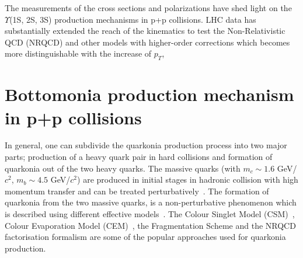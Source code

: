 The measurements of the cross sections and polarizations have shed light on the
$\Upsilon$(1S, 2S, 3S) production mechanisms in p+p collisions.
LHC data has substantially extended the reach of the kinematics to test the
Non-Relativistic QCD (NRQCD) and other models with
higher-order corrections which becomes more
distinguishable with the increase of $p_{T}$,






\section{Bottomonia production mechanism in p+p collisions}
\label{sec:Bottomonia_pp_th}


In general, one can subdivide the quarkonia production process into two major parts;
production of a heavy quark pair in hard collisions and formation of quarkonia
out of the two heavy quarks.
  The massive quarks (with $m_c\sim 1.6$ GeV/$c^2$, $m_b\sim 4.5$ GeV/$c^2$) are produced
in initial stages in hadronic collision with high momentum transfer and 
can be treated perturbatively~\cite{Nason:1989zy}. The formation of quarkonia
from the two massive quarks, is a non-perturbative phenomenon which is
described using different effective models~\cite{Bodwin:1994jh,Brambilla:2014jmp}.
The Colour Singlet Model (CSM)~\cite{Einhorn:1975ua,Berger:1980ni},
Colour Evaporation Model (CEM)~\cite{Fritzsch:1977ay,Amundson:1995em}, the Fragmentation
Scheme and the NRQCD factorisation formalism are some of the popular
approaches used for quarkonia production.


